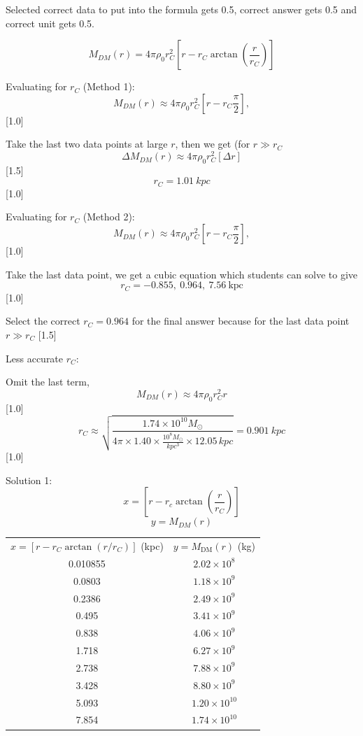 \begin{description}
  Selected correct data to put into the formula gets 0.5, correct answer
  gets 0.5 and correct unit gets 0.5.

  \[ M_{DM}(r) = 4\pi\rho_0 r_C^2
     \left[r - r_C\arctan\left(\frac{r}{r_C}\right)\right] \]

  Evaluating for $r_C$ (Method 1):
  \[ M_{DM}(r) \approx 4\pi\rho_0 r_C^2
     \left[r - r_C\frac{\pi}{2}\right], \]
  \hfill[1.0]

  Take the last two data points at large $r$, then we get (for
  $r \gg r_C$
  \[ \Delta M_{DM}(r) \approx 4\pi\rho_0 r_C^2\left[\Delta r\right] \]
  \hfill[1.5]
  \[ r_C = 1.01\ kpc \]
  \hfill[1.0]

  Evaluating for $r_C$ (Method 2):
  \[ M_{DM}(r) \approx 4\pi\rho_0 r_C^2
     \left[r - r_C\frac{\pi}{2}\right], \]
  \hfill[1.0]

  Take the last data point, we get a cubic equation which students can
  solve to give
  \[ r_C = -0.855,\ 0.964,\ 7.56\ \text{kpc} \]
  \hfill[1.0]

  Select the correct $r_C = 0.964$ for the final answer because for the
  last data point $r \gg r_C$ \hfill[1.5]

  Less accurate $r_C$:

  Omit the last term,
  \[ M_{DM}(r) \approx 4\pi\rho_0 r_C^2 r \]
  \hfill[1.0]
  \[ r_C \approx \sqrt{\frac{1.74\times 10^{10}M_\odot}
     {4\pi\times 1.40\times\frac{10^{8}M_\odot}{kpc^3}\times 12.05\,kpc}}
     = 0.901\ kpc \]
  \hfill[1.0]

\item[(D2.4)] Solution 1:
  \[ x = \left[r - r_c\arctan\left(\frac{r}{r_C}\right)\right] \]
  \[ y = M_{DM}(r) \]

  \begin{center}
  \begin{tabular}{cc}
  $x = \left[r - r_C\arctan(r/r_C)\right]$ (kpc)
    & $y = M_{\mathrm{DM}}(r)$ (kg)\\
  0.010855 & $2.02\times 10^{8}$\\
  0.0803 & $1.18\times 10^{9}$\\
  0.2386 & $2.49\times 10^{9}$\\
  0.495 & $3.41\times 10^{9}$\\
  0.838 & $4.06\times 10^{9}$\\
  1.718 & $6.27\times 10^{9}$\\
  2.738 & $7.88\times 10^{9}$\\
  3.428 & $8.80\times 10^{9}$\\
  5.093 & $1.20\times 10^{10}$\\
  7.854 & $1.74\times 10^{10}$
  \end{tabular}
  \end{center}


\end{description}
